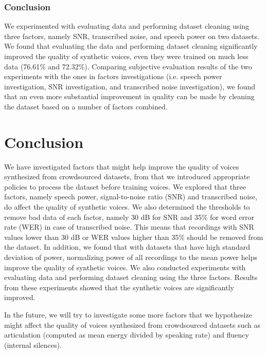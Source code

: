 \documentclass[12pt]{article}
\begin{document}
\subsubsection{Conclusion}
We experimented with evaluating data and performing dataset cleaning using three factors, namely SNR, transcribed noise, and speech power on two datasets. We found that evaluating the data and performing dataset cleaning significantly improved the quality of synthetic voices, even they were trained on much less data (76.61\% and 72.32\%). Comparing subjective evaluation results of the two experiments with the ones in factors investigations (i.e. speech power investigation, SNR investigation, and transcribed noise investigation), we found that an even more substantial improvement in quality can be made by cleaning the dataset based on a number of factors combined.



\newpage
\section{Conclusion}\label{sec_conclusion}
We have investigated factors that might help improve the quality of voices synthesized from crowdsourced datasets, from that we introduced appropriate policies to process the dataset before training voices. We explored that three factors, namely speech power, signal-to-noise ratio (SNR) and transcribed noise, do affect the quality of synthetic voices. We also determined the thresholds to remove bad data of each factor, namely 30 dB for SNR and 35\% for word error rate (WER) in case of transcribed noise. This means that recordings with SNR values lower than 30 dB or WER values higher than 35\% should be removed from the dataset. In addition, we found that with datasets that have high standard deviation of power, normalizing power of all recordings to the mean power helps improve the quality of synthetic voices. We also conducted experiments with evaluating data and performing dataset cleaning using the three factors. Results from these experiments showed that the synthetic voices are significantly improved.

In the future, we will try to investigate some more factors that we hypothesize might affect the quality of voices synthesized from crowdsourced datasets such as articulation (computed as mean energy divided by speaking rate) and fluency (internal silences).
\end{document}
